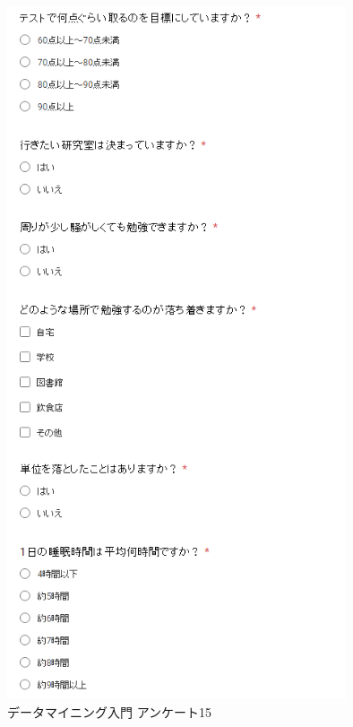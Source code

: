 \begin{figure}[p]
\centering
\includegraphics[width=10cm]{forms15.PNG}
\caption{データマイニング入門 アンケート15}\label{サンプル図}
\end{figure}


